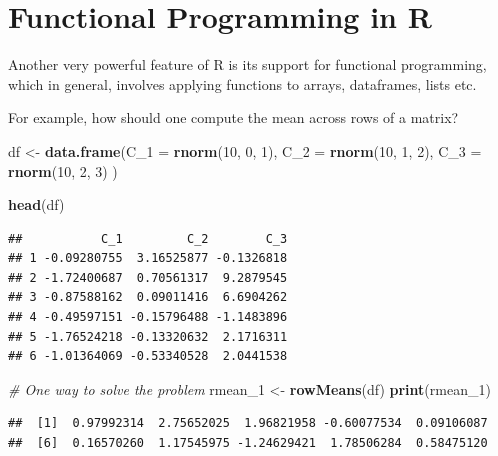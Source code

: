 \documentclass[12pt,]{article}
\newenvironment{Shaded}{\begin{snugshade}}{\end{snugshade}}
\newcommand{\KeywordTok}[1]{\textcolor[rgb]{0.13,0.29,0.53}{\textbf{#1}}}
\newcommand{\DataTypeTok}[1]{\textcolor[rgb]{0.13,0.29,0.53}{#1}}
\newcommand{\DecValTok}[1]{\textcolor[rgb]{0.00,0.00,0.81}{#1}}
\newcommand{\StringTok}[1]{\textcolor[rgb]{0.31,0.60,0.02}{#1}}
\newcommand{\CommentTok}[1]{\textcolor[rgb]{0.56,0.35,0.01}{\textit{#1}}}
\newcommand{\NormalTok}[1]{#1}
\begin{document}
\section{Functional Programming in R}\label{functional-programming-in-r}

Another very powerful feature of R is its support for functional
programming, which in general, involves applying functions to arrays,
dataframes, lists etc.

For example, how should one compute the mean across rows of a matrix?

\begin{Shaded}
\begin{Highlighting}[]
\NormalTok{df <-}\StringTok{ }\KeywordTok{data.frame}\NormalTok{(}\DataTypeTok{C_1 =} \KeywordTok{rnorm}\NormalTok{(}\DecValTok{10}\NormalTok{, }\DecValTok{0}\NormalTok{, }\DecValTok{1}\NormalTok{), }
                 \DataTypeTok{C_2 =} \KeywordTok{rnorm}\NormalTok{(}\DecValTok{10}\NormalTok{, }\DecValTok{1}\NormalTok{, }\DecValTok{2}\NormalTok{),}
                 \DataTypeTok{C_3 =} \KeywordTok{rnorm}\NormalTok{(}\DecValTok{10}\NormalTok{, }\DecValTok{2}\NormalTok{, }\DecValTok{3}\NormalTok{)}
\NormalTok{                 )}

\KeywordTok{head}\NormalTok{(df)}
\end{Highlighting}
\end{Shaded}

\begin{verbatim}
##           C_1         C_2        C_3
## 1 -0.09280755  3.16525877 -0.1326818
## 2 -1.72400687  0.70561317  9.2879545
## 3 -0.87588162  0.09011416  6.6904262
## 4 -0.49597151 -0.15796488 -1.1483896
## 5 -1.76524218 -0.13320632  2.1716311
## 6 -1.01364069 -0.53340528  2.0441538
\end{verbatim}

\begin{Shaded}
\begin{Highlighting}[]
\CommentTok{# One way to solve the problem}
\NormalTok{rmean_}\DecValTok{1}\NormalTok{ <-}\StringTok{ }\KeywordTok{rowMeans}\NormalTok{(df)}
\KeywordTok{print}\NormalTok{(rmean_}\DecValTok{1}\NormalTok{)}
\end{Highlighting}
\end{Shaded}

\begin{verbatim}
##  [1]  0.97992314  2.75652025  1.96821958 -0.60077534  0.09106087
##  [6]  0.16570260  1.17545975 -1.24629421  1.78506284  0.58475120
\end{verbatim}
\end{document}
